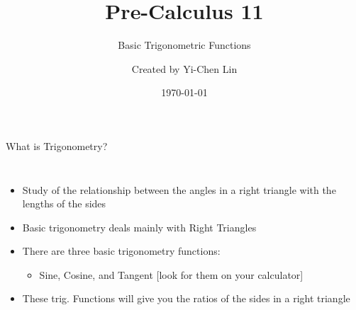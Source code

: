 \documentclass[aspectratio=169]{beamer}
\title{Pre-Calculus 11}
\subtitle{Basic Trigonometric Functions}
\author{Created by Yi-Chen Lin}
\date{\today}
\begin{document}
\begin{frame}
    \titlepage
\end{frame}

\begin{frame}{What is Trigonometry?}
    \begin{tcolorbox}[colback=lightgray,colframe=primary,title=Introduction]
        \footnotesize
        \begin{columns}
            \begin{itemize}
                \item Study of the relationship between the angles in a right triangle with the lengths of the sides
                \item Basic trigonometry deals mainly with Right Triangles
                \item There are three basic trigonometry functions:
                \begin{itemize}
                    \item Sine, Cosine, and Tangent [look for them on your calculator]
                \end{itemize}
                \item These trig. Functions will give you the ratios of the sides in a right triangle
            \end{itemize}
        \end{columns}
    \end{tcolorbox}
\end{frame}
\end{document}
